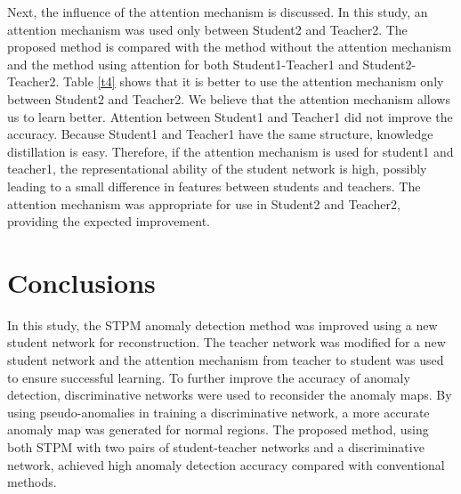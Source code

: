 \documentclass[letterpaper, 10 pt, conference]{ieeeconf}
\begin{document}
Next, the influence of the attention mechanism is discussed. In this study, an attention mechanism was used only between Student2 and Teacher2. The proposed method is compared with the method without the attention mechanism and the method using attention for both Student1-Teacher1 and Student2-Teacher2. Table \ref{t4} shows that it is better to use the attention mechanism only between Student2 and Teacher2. We believe that the attention mechanism allows us to learn better. 
Attention between Student1 and Teacher1 did not improve the accuracy. Because Student1 and Teacher1 have the same structure, knowledge distillation is easy. Therefore, if the attention mechanism is used for student1 and teacher1, the representational ability of the student network is high, possibly leading to a small difference in features between students and teachers. The attention mechanism was appropriate for use in Student2 and Teacher2, providing the expected improvement.

\section{Conclusions}

In this study, the STPM anomaly detection method was improved using a new student network for reconstruction. The teacher network was modified for a new student network and the attention mechanism from teacher to student was used to ensure successful learning. To further improve the accuracy of anomaly detection, discriminative networks were used to reconsider the anomaly maps. By using pseudo-anomalies in training a discriminative network, a more accurate anomaly map was generated for normal regions. The proposed method, using both STPM with two pairs of student-teacher networks and a discriminative network, achieved high anomaly detection accuracy compared with conventional methods.



\addtolength{\textheight}{-12cm}   
\end{document}
